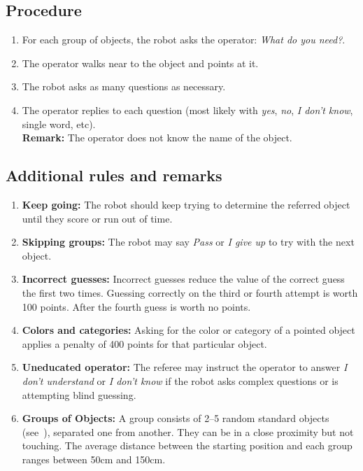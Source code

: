%
%
\subsection*{Procedure}
\begin{enumerate}[nosep]
	\item For each group of objects, the robot asks the operator: \emph{What do you need?}.  %
		\item The operator walks near to the object and points at it.
		\item The robot asks as many questions as necessary. 
		\item The operator replies to each question (most likely with \emph{yes}, \emph{no}, \emph{I don't know}, single word, etc).
		\\\textbf{Remark:} The operator does not know the name of the object.
\end{enumerate}


%
%
\subsection*{Additional rules and remarks}
\begin{enumerate}[nosep]
	\item \textbf{Keep going:} The robot should keep trying to determine the referred object until they score or run out of time.

	\item \textbf{Skipping groups:} The robot may say \emph{Pass} or \emph{I give up} to try with the next object.

	\item \textbf{Incorrect guesses:} Incorrect guesses reduce the value of the correct guess the first two times. Guessing correctly on the third or fourth attempt is worth 100 points. After the fourth guess is worth no points.

	\item\textbf{Colors and categories:} Asking for the color or category of a pointed object applies a penalty of 400 points for that particular object.

	\item\textbf{Uneducated operator:} The referee may instruct the operator to answer \emph{I don't understand} or \emph{I don't know} if the robot asks complex questions or is attempting blind guessing.

	\item \textbf{Groups of Objects:} A group consists of 2--5 random standard objects (see~), separated one from another. They can be in a close proximity but not touching.
	The average distance between the starting position and each group ranges between 50cm and 150cm.

\end{enumerate}

